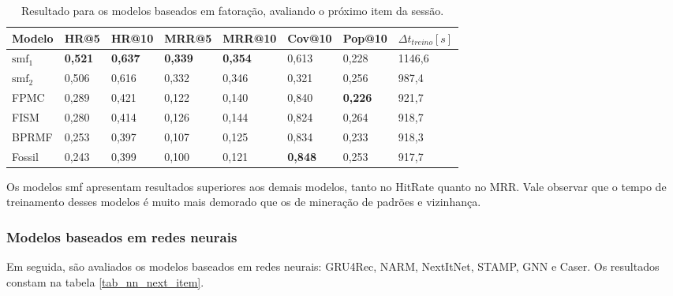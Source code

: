 \begin{table}[htbp]
  \centering
  \begin{tabular}{|l|l|l|l|l|l|l|l|}
    \hline
    Modelo & HR@5 & HR@10 & MRR@5 & MRR@10 & Cov@10 & Pop@10 & $\Delta t_{treino} [s]$ \\
    \hline
    $\text{smf}_1$ & \textbf{0,521} & \textbf{0,637} & \textbf{0,339} & \textbf{0,354} & 0,613 & 0,228 & 1146,6 \\
    \hline
    $\text{smf}_2$ & 0,506 & 0,616 & 0,332 & 0,346 & 0,321 & 0,256 & 987,4 \\
    \hline
    FPMC & 0,289 & 0,421 & 0,122 & 0,140 & 0,840 & \textbf{0,226} & 921,7 \\
    \hline
    FISM & 0,280 & 0,414 & 0,126 & 0,144 & 0,824 & 0,264 & 918,7 \\
    \hline
    BPRMF & 0,253 & 0,397 & 0,107 & 0,125 & 0,834 & 0,233 & 918,3 \\
    \hline
    Fossil & 0,243 & 0,399 & 0,100 & 0,121 & \textbf{0,848} & 0,253 & 917,7 \\
    \hline
        \end{tabular}
  \caption{Resultado para os modelos baseados em fatoração, avaliando o próximo item da sessão.}
  \label{tab_fatoracao}
\end{table}

Os modelos smf apresentam resultados superiores aos demais modelos, tanto no
HitRate quanto no MRR. Vale observar que o tempo de treinamento desses modelos é
muito mais demorado que os de mineração de padrões e vizinhança.

\subsubsection{Modelos baseados em redes neurais}
Em seguida, são avaliados os modelos baseados em redes neurais: GRU4Rec, NARM,
NextItNet, STAMP, GNN e Caser. Os resultados constam na tabela \ref{tab_nn_next_item}.


